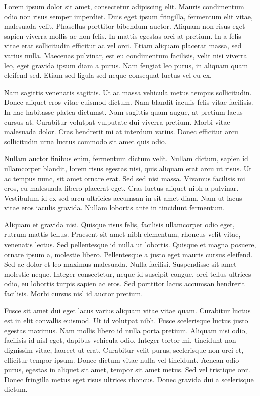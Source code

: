 Lorem ipsum dolor sit amet, consectetur adipiscing elit. Mauris condimentum odio non risus semper imperdiet. Duis eget ipsum fringilla, fermentum elit vitae, malesuada velit. Phasellus porttitor bibendum auctor. Aliquam non risus eget sapien viverra mollis ac non felis. In mattis egestas orci at pretium. In a felis vitae erat sollicitudin efficitur ac vel orci. Etiam aliquam placerat massa, sed varius nulla. Maecenas pulvinar, est eu condimentum facilisis, velit nisi viverra leo, eget gravida ipsum diam a purus. Nam feugiat leo purus, in aliquam quam eleifend sed. Etiam sed ligula sed neque consequat luctus vel eu ex.

Nam sagittis venenatis sagittis. Ut ac massa vehicula metus tempus sollicitudin. Donec aliquet eros vitae euismod dictum. Nam blandit iaculis felis vitae facilisis. In hac habitasse platea dictumst. Nam sagittis quam augue, at pretium lacus cursus at. Curabitur volutpat vulputate dui viverra pretium. Morbi vitae malesuada dolor. Cras hendrerit mi at interdum varius. Donec efficitur arcu sollicitudin urna luctus commodo sit amet quis odio.

Nullam auctor finibus enim, fermentum dictum velit. Nullam dictum, sapien id ullamcorper blandit, lorem risus egestas nisi, quis aliquam erat arcu ut risus. Ut ac tempus nunc, sit amet ornare erat. Sed sed nisi massa. Vivamus facilisis mi eros, eu malesuada libero placerat eget. Cras luctus aliquet nibh a pulvinar. Vestibulum id ex sed arcu ultricies accumsan in sit amet diam. Nam ut lacus vitae eros iaculis gravida. Nullam lobortis ante in tincidunt fermentum.

Aliquam et gravida nisi. Quisque risus felis, facilisis ullamcorper odio eget, rutrum mattis tellus. Praesent sit amet nibh elementum, rhoncus velit vitae, venenatis lectus. Sed pellentesque id nulla ut lobortis. Quisque et magna posuere, ornare ipsum a, molestie libero. Pellentesque a justo eget mauris cursus eleifend. Sed ac dolor et leo maximus malesuada. Nulla facilisi. Suspendisse sit amet molestie neque. Integer consectetur, neque id suscipit congue, orci tellus ultrices odio, eu lobortis turpis sapien ac eros. Sed porttitor lacus accumsan hendrerit facilisis. Morbi cursus nisl id auctor pretium.

Fusce sit amet dui eget lacus varius aliquam vitae vitae quam. Curabitur luctus est in elit convallis euismod. Ut id volutpat nibh. Fusce scelerisque luctus justo egestas maximus. Nam mollis libero id nulla porta pretium. Aliquam nisi odio, facilisis id nisl eget, dapibus vehicula odio. Integer tortor mi, tincidunt non dignissim vitae, laoreet ut erat. Curabitur velit purus, scelerisque non orci et, efficitur tempor ipsum. Donec dictum vitae nulla vel tincidunt. Aenean odio purus, egestas in aliquet sit amet, tempor sit amet metus. Sed vel tristique orci. Donec fringilla metus eget risus ultrices rhoncus. Donec gravida dui a scelerisque dictum.